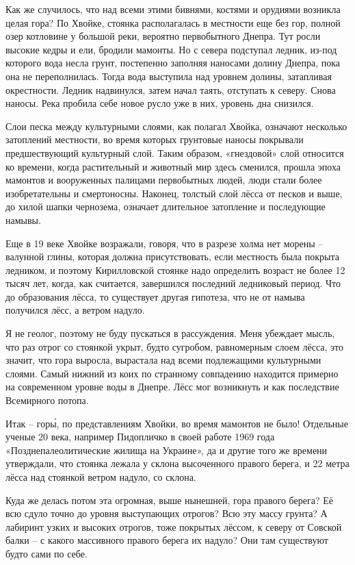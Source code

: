 Как же случилось, что над всеми этими бивнями, костями и орудиями возникла целая гора? По Хвойке, стоянка располагалась в местности еще без гор, полной озер котловине у большой реки, вероятно первобытного Днепра. Тут росли высокие кедры и ели, бродили мамонты. Но с севера подступал ледник, из-под которого вода несла грунт, постепенно заполняя наносами долину Днепра, пока она не переполнилась. Тогда вода выступила над уровнем долины, затапливая окрестности. Ледник надвинулся, затем начал таять, отступать к северу. Снова наносы. Река пробила себе новое русло уже в них, уровень дна снизился.

Слои песка между культурными слоями, как полагал Хвойка, означают несколько затоплений местности, во время которых грунтовые наносы покрывали предшествующий культурный слой. Таким образом, «гнездовой» слой относится ко времени, когда растительный и животный мир здесь сменился, прошла эпоха мамонтов и вооруженных палицами первобытных людей, люди стали более изобретательны и смертоносны. Наконец, толстый слой лёсса от песков и выше, до хилой шапки чернозема, означает длительное затопление и последующие намывы.

Еще в 19 веке Хвойке возражали, говоря, что в разрезе холма нет морены – валунной глины, которая должна присутствовать, если местность была покрыта ледником, и поэтому Кирилловской стоянке надо определить возраст не более 12 тысяч лет, когда, как считается, завершился последний ледниковый период. Что до образования лёсса, то существует другая гипотеза, что не от намыва получился лёсс, а ветром надуло.

Я не геолог, поэтому не буду пускаться в рассуждения. Меня убеждает мысль, что раз отрог со стоянкой укрыт, будто сугробом, равномерным слоем лёсса, это значит, что гора выросла, вырастала над всеми подлежащими культурными слоями. Самый нижний из коих по странному совпадению находится примерно на современном уровне воды в Днепре. Лёсс мог возникнуть и как последствие Всемирного потопа.

Итак – гор\'ы, по представлениям Хвойки, во время мамонтов не было! Отдельные ученые 20 века, например Пидопличко в своей работе 1969 года «Позднепалеолитические жилища на Украине», да и другие того же времени утверждали, что стоянка лежала у склона высоченного правого берега, и 22 метра лёсса над стоянкой ветром надуло, со склона.

Куда же делась потом эта огромная, выше нынешней, гора правого берега? Её всю сдуло точно до уровня выступающих отрогов? Всю эту массу грунта? А лабиринт узких и высоких отрогов, тоже покрытых лёссом, к северу от Совской балки – с какого массивного правого берега их надуло? Они там существуют будто сами по себе.

